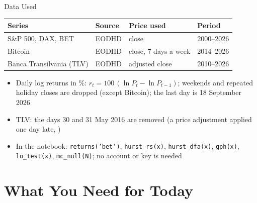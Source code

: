 \begin{frame}{Data Used}
\itemsize{\small}
\begin{center}
\footnotesize
\begin{tabular}{llll}
\toprule
\textbf{Series} & \textbf{Source} & \textbf{Price used} & \textbf{Period} \\
\midrule
S\&P 500, DAX, BET & EODHD & close & 2000--2026 \\
Bitcoin & EODHD & close, 7 days a week & 2014--2026 \\
Banca Transilvania (TLV) & EODHD & adjusted close & 2010--2026 \\
\bottomrule
\end{tabular}
\end{center}
\begin{itemize}
    \item Daily log returns in \%: $r_t = 100\,(\ln P_t - \ln P_{t-1})$; weekends and repeated holiday closes are dropped (except Bitcoin); the last day is 18 September 2026
    \item TLV: the days 30 and 31 May 2016 are removed (a price adjustment applied one day late, )
    \item In the notebook: \texttt{returns('bet')}, \texttt{hurst\_rs(x)}, \texttt{hurst\_dfa(x)}, \texttt{gph(x)}, \texttt{lo\_test(x)}, \texttt{mc\_null(N)}; no account or key is needed
\end{itemize}
\end{frame}


\section{What You Need for Today}

